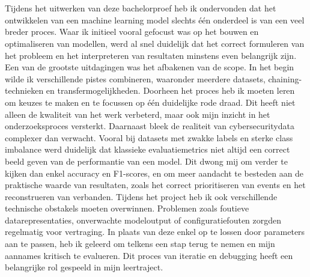 


\chapter*{}%
\label{ch:voorwoord}

Tijdens het uitwerken van deze bachelorproef heb ik ondervonden dat het ontwikkelen van een machine learning model slechts één onderdeel is van een veel breder proces. Waar ik initieel vooral gefocust was op het bouwen en optimaliseren van modellen, werd al snel duidelijk dat het correct formuleren van het probleem en het interpreteren van resultaten minstens even belangrijk zijn.
\newline
\newline
Een van de grootste uitdagingen was het afbakenen van de scope. In het begin wilde ik verschillende pistes combineren, waaronder meerdere datasets, chaining-technieken en transfermogelijkheden. Doorheen het proces heb ik moeten leren om keuzes te maken en te focussen op één duidelijke rode draad. Dit heeft niet alleen de kwaliteit van het werk verbeterd, maar ook mijn inzicht in het onderzoeksproces versterkt.
\newline
\newline
Daarnaast bleek de realiteit van cybersecuritydata complexer dan verwacht. Vooral bij datasets met zwakke labels en sterke class imbalance werd duidelijk dat klassieke evaluatiemetrics niet altijd een correct beeld geven van de performantie van een model. Dit dwong mij om verder te kijken dan enkel accuracy en F1-scores, en om meer aandacht te besteden aan de praktische waarde van resultaten, zoals het correct prioritiseren van events en het reconstrueren van verbanden.
\newline
\newline
Tijdens het project heb ik ook verschillende technische obstakels moeten overwinnen. Problemen zoals foutieve datarepresentaties, onverwachte modeloutput of configuratiefouten zorgden regelmatig voor vertraging. In plaats van deze enkel op te lossen door parameters aan te passen, heb ik geleerd om telkens een stap terug te nemen en mijn aannames kritisch te evalueren. Dit proces van iteratie en debugging heeft een belangrijke rol gespeeld in mijn leertraject.

